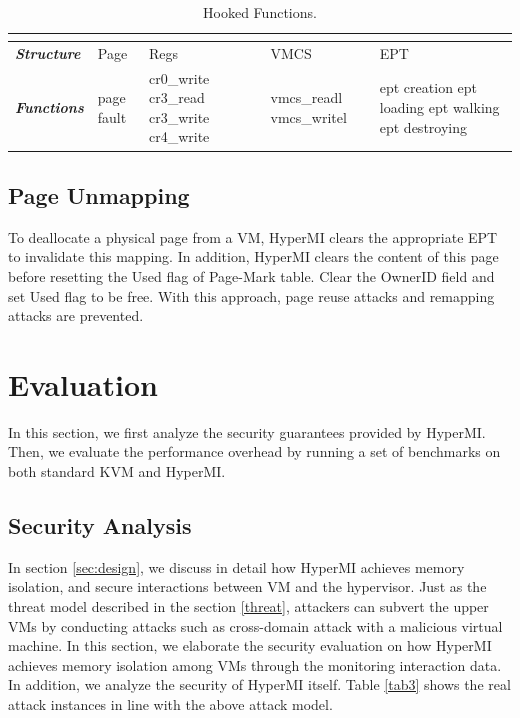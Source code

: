 \documentclass[conference]{IEEEtran}
\begin{document}
\begin{table}
\centering
\caption{Hooked Functions.}\label{tabhook}
\begin{tabular}{p{1cm}|p{1.2cm}|p{1.1cm}|p{1.4cm}|p{1.6cm}}
\hline
\multicolumn{5}{c}{\bfseries\textbf\centering{Hooked Functions}}\\
\hline
{\itshape\bfseries Structure} & Page & Regs & VMCS & EPT \\
\hline
{\itshape\bfseries Functions} &page fault & cr0\_write cr3\_read cr3\_write cr4\_write & vmcs\_readl vmcs\_writel & ept creation ept loading ept walking ept destroying \\
\hline
\end{tabular}
\end{table}

\subsection {Page Unmapping}

To deallocate a physical page from a VM, HyperMI clears the appropriate EPT to invalidate this mapping. In addition, HyperMI clears the content of this page before resetting the Used flag of Page-Mark table. Clear the OwnerID field and set Used flag to be free. With this approach, page reuse attacks and remapping attacks are prevented.
\fi


\section{Evaluation}\label{sec:evaluation}
In this section, we first analyze the security guarantees provided by HyperMI. Then, we evaluate the performance overhead by running a set of benchmarks on both standard KVM and HyperMI.



\subsection{Security Analysis}
 
In section \ref{sec:design}, we discuss in detail how HyperMI achieves memory isolation, and secure interactions between VM and the hypervisor. Just as the threat model described in the section \ref{threat}, attackers can subvert the upper VMs by conducting attacks such as cross-domain attack with a malicious virtual machine.
In this section, we elaborate the security evaluation on how HyperMI achieves memory isolation among VMs through the monitoring interaction data. 
In addition, we analyze the security of HyperMI itself. Table \ref{tab3} shows the real attack instances in line with the above attack model. 
\end{document}
